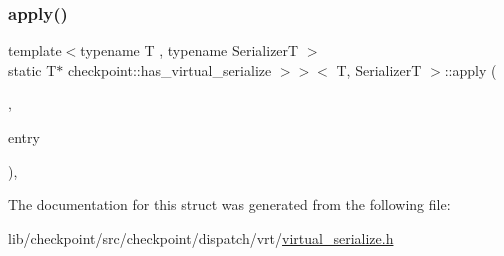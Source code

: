 \subsubsection{\texorpdfstring{apply()}{apply()}}
{\footnotesize\ttfamily template$<$typename T , typename SerializerT $>$ \\
static T$\ast$ checkpoint\+::has\+\_\+virtual\+\_\+serialize $>$$>$$<$ T, SerializerT $>$\+::apply (\begin{DoxyParamCaption}\item[{SerializerT \&}]{,  }\item[{\hyperlink{namespacecheckpoint_1_1dispatch_1_1vrt_acd3f9e6b091bcfbc23dc35ea8ef45d3b}{dispatch\+::vrt\+::\+Type\+Idx}}]{entry }\end{DoxyParamCaption})\hspace{0.3cm}{\ttfamily [inline]}, {\ttfamily [static]}}



The documentation for this struct was generated from the following file\+:\begin{DoxyCompactItemize}
\item 
lib/checkpoint/src/checkpoint/dispatch/vrt/\hyperlink{virtual__serialize_8h}{virtual\+\_\+serialize.\+h}\end{DoxyCompactItemize}
